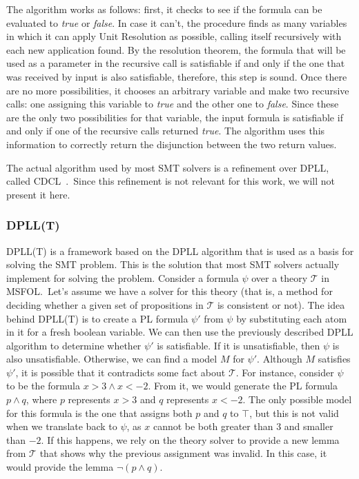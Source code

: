 The algorithm works as follows: first, it checks to see if the formula can be evaluated to \textit{true} or \textit{false}. In case it can't, the procedure finds as many variables in which it can apply Unit Resolution as possible, calling itself recursively with each new application found. By the resolution theorem, the formula that will be used as a parameter in the recursive call is satisfiable if and only if the one that was received by input is also satisfiable, therefore, this step is sound. Once there are no more possibilities, it chooses an arbitrary variable and make two recursive calls: one assigning this variable to \textit{true} and the other one to \textit{false}. Since these are the only two possibilities for that variable, the input formula is satisfiable if and only if one of the recursive calls returned \textit{true}. The algorithm uses this information to correctly return the disjunction between the two return values.

The actual algorithm used by most SMT solvers is a refinement over DPLL, called CDCL~\cite{cdcl}.\ Since this refinement is not relevant for this work, we will not present it here.

\subsubsection{DPLL(T)}

DPLL(T) is a framework based on the DPLL algorithm that is used as a basis for solving the SMT problem. This is the solution that most SMT solvers actually implement for solving the problem. Consider a formula $\psi$ over a theory $\mathcal{T}$ in MSFOL.\ Let's assume we have a solver for this theory (that is, a method for deciding whether a given set of propositions in $\mathcal{T}$ is consistent or not). The idea behind DPLL(T) is to create a PL formula $\psi'$ from $\psi$ by substituting each atom in it for a fresh boolean variable. We can then use the previously described DPLL algorithm to determine whether $\psi'$ is satisfiable. If it is unsatisfiable, then $\psi$ is also unsatisfiable. Otherwise, we can find a model $M$ for $\psi'$. Although $M$ satisfies $\psi'$, it is possible that it contradicts some fact about $\mathcal{T}$. For instance, consider $\psi$ to be the formula $x > 3 \wedge x < -2$. From it, we would generate the PL formula $p \wedge q$, where $p$ represents $x > 3$ and $q$ represents $x < -2$. The only possible model for this formula is the one that assigns both $p$ and $q$ to $\top$, but this is not valid when we translate back to $\psi$, as $x$ cannot be both greater than $3$ and smaller than $-2$. If this happens, we rely on the theory solver to provide a new lemma from $\mathcal{T}$ that shows why the previous assignment was invalid. In this case, it would provide the lemma $\neg (p \wedge q)$.


